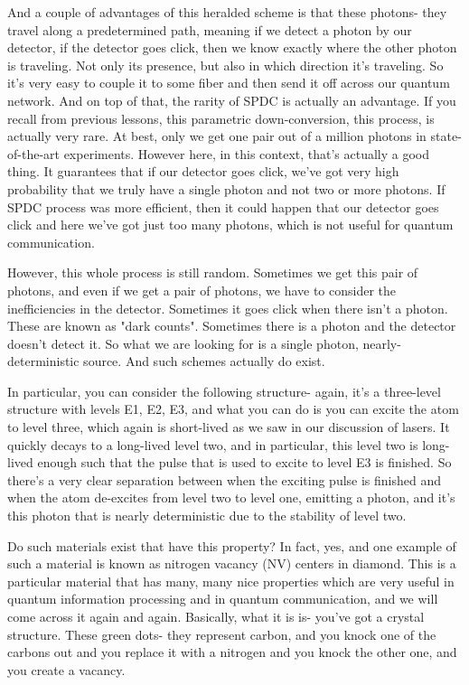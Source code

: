 And a couple of advantages of this heralded scheme is that these photons- they travel along a predetermined path, meaning if we detect a photon by our detector, if the detector goes click, then we know exactly where the other photon is traveling. Not only its presence, but also in which direction it's traveling. So it's very easy to couple it to some fiber and then send it off across our quantum network. And on top of that, the rarity of SPDC is actually an advantage. If you recall from previous lessons, this parametric down-conversion, this process, is actually very rare. At best, only we get one pair out of a million photons in state-of-the-art experiments. However here, in this context, that's actually a good thing. It guarantees that if our detector goes click, we've got very high probability that we truly have a single photon and not two or more photons. If SPDC process was more efficient, then it could happen that our detector goes click and here we've got just too many photons, which is not useful for quantum communication.

However, this whole process is still random. Sometimes we get this pair of photons, and even if we get a pair of photons, we have to consider the inefficiencies in the detector. Sometimes it goes click when there isn't a photon. These are known as "dark counts". Sometimes there is a photon and the detector doesn't detect it. So what we are looking for is a single photon, nearly-deterministic source. And such schemes actually do exist.

In particular, you can consider the following structure- again, it's a three-level structure with levels E1, E2, E3, and what you can do is you can excite the atom to level three, which again is short-lived as we saw in our discussion of lasers. It quickly decays to a long-lived level two, and in particular, this level two is long-lived enough such that the pulse that is used to excite to level E3 is finished. So there's a very clear separation between when the exciting pulse is finished and when the atom de-excites from level two to level one, emitting a photon, and it's this photon that is nearly deterministic due to the stability of level two.

Do such materials exist that have this property? In fact, yes, and one example of such a material is known as nitrogen vacancy (NV) centers in diamond. This is a particular material that has many, many nice properties which are very useful in quantum information processing and in quantum communication, and we will come across it again and again. Basically, what it is is- you've got a crystal structure. These green dots- they represent carbon, and you knock one of the carbons out and you replace it with a nitrogen and you knock the other one, and you create a vacancy.


